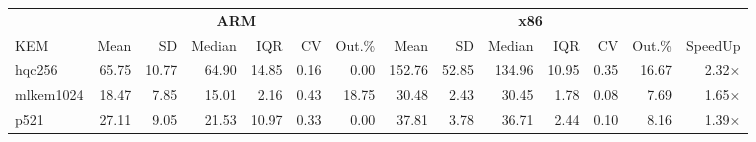 \begin{table}[!ht]
\centering
\begin{tabular}{l|rrrrrr|rrrrrr|r}
\toprule
& \multicolumn{6}{c}{\bfseries ARM} & \multicolumn{6}{c}{\bfseries x86} & \\
\cmidrule(lr){2-7} \cmidrule(lr){8-13}
KEM & Mean & SD & Median & IQR & CV & Out.\% & Mean & SD & Median & IQR & CV & Out.\% & SpeedUp \\
\midrule
hqc256 & 65.75 & 10.77 & 64.90 & 14.85 & 0.16 & 0.00 & 152.76 & 52.85 & 134.96 & 10.95 & 0.35 & 16.67 & 2.32× \\
mlkem1024 & 18.47 & 7.85 & 15.01 & 2.16 & 0.43 & 18.75 & 30.48 & 2.43 & 30.45 & 1.78 & 0.08 & 7.69 & 1.65× \\
p521 & 27.11 & 9.05 & 21.53 & 10.97 & 0.33 & 0.00 & 37.81 & 3.78 & 36.71 & 2.44 & 0.10 & 8.16 & 1.39× \\
\bottomrule
\end{tabular}
\end{table}
